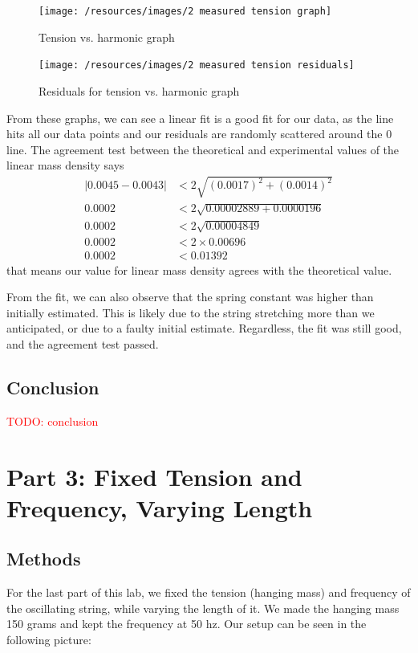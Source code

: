 \documentclass[11pt]{article}
\let\oldsection\section
\renewcommand\section{\clearpage\oldsection}
\newcommand{\todo}[1]{\textcolor{red}{TODO: #1}\PackageWarning{TODO:}{#1!}}
\begin{document}
    \begin{figure}[H]
        \texttt{[image: /resources/images/2 measured tension graph]}
        \caption{Tension vs. harmonic graph}
        \label{fig:measured_tension}
    \end{figure}

    \begin{figure}[H]
        \texttt{[image: /resources/images/2 measured tension residuals]}
        \caption{Residuals for tension vs. harmonic graph}
        \label{fig:measured_tension_residuals}
    \end{figure}

    From these graphs, we can see a linear fit is a good fit for our data, as the line hits all our data points and our residuals are randomly scattered around the 0 line.
    The agreement test between the theoretical and experimental values of the linear mass density says
    \begin{align*}
        |0.0045 - 0.0043| &< 2 \sqrt{(0.0017)^2 + (0.0014)^2} \\
        0.0002 &< 2 \sqrt{0.00002889 + 0.0000196} \\
        0.0002 &< 2 \sqrt{0.00004849} \\
        0.0002 &< 2 \times 0.00696 \\
        0.0002 &< 0.01392
    \end{align*}
    that means our value for linear mass density agrees with the theoretical value.

    From the fit, we can also observe that the spring constant was higher than initially estimated.
    This is likely due to the string stretching more than we anticipated, or due to a faulty initial estimate.
    Regardless, the fit was still good, and the agreement test passed.

    \subsection{Conclusion}\label{subsec:part_2_conclusion}

    \todo{conclusion}

    \section{Part 3: Fixed Tension and Frequency, Varying Length}\label{sec:part_3}
    \subsection{Methods}\label{subsec:part_3_methods}
    For the last part of this lab, we fixed the tension (hanging mass) and frequency of the oscillating string, while varying the length of it. We made the hanging mass 150 grams and kept the frequency at 50 hz. Our setup can be seen in the following picture:
\end{document}
